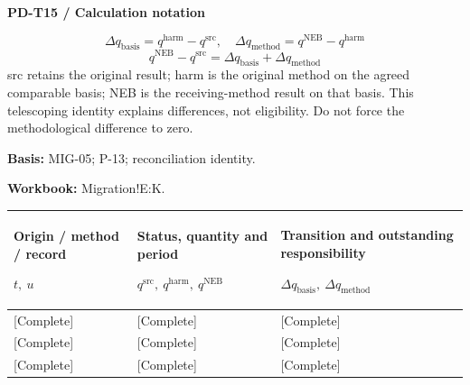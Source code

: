 \par\begingroup\sffamily\fontsize{8}{10}\selectfont\color{NEBGreen}\setlength{\parskip}{2pt}\setlength{\abovedisplayskip}{4pt}\setlength{\belowdisplayskip}{4pt}\setlength{\abovedisplayshortskip}{2pt}\setlength{\belowdisplayshortskip}{3pt}
\textbf{PD-T15 / Calculation notation}\par
{\fontsize{9}{11}\selectfont\[ \Delta q_{\mathrm{basis}}=q^{\mathrm{harm}}-q^{\mathrm{src}},\quad \Delta q_{\mathrm{method}}=q^{\mathrm{NEB}}-q^{\mathrm{harm}} \]}
{\fontsize{9}{11}\selectfont\[ q^{\mathrm{NEB}}-q^{\mathrm{src}}=\Delta q_{\mathrm{basis}}+\Delta q_{\mathrm{method}} \]}
src retains the original result; harm is the original method on the agreed comparable basis; NEB is the receiving-method result on that basis. This telescoping identity explains differences, not eligibility. Do not force the methodological difference to zero.\par
\textbf{Basis:} MIG-05; P-13; reconciliation identity.\par
\textbf{Workbook:} Migration!E:K.\par\endgroup
{\sffamily\fontsize{8.3}{10.3}\selectfont\begin{longtable}{@{}P{52.79mm} P{51.14mm} P{61.14mm}@{}}
\toprule
\textbf{Origin / method / record}\par {\normalfont\fontsize{8.2}{10}\selectfont $t,\ u$} & \textbf{Status, quantity and period}\par {\normalfont\fontsize{8.2}{10}\selectfont $q^{\mathrm{src}},\ q^{\mathrm{harm}},\ q^{\mathrm{NEB}}$} & \textbf{Transition and outstanding responsibility}\par {\normalfont\fontsize{8.2}{10}\selectfont $\Delta q_{\mathrm{basis}},\ \Delta q_{\mathrm{method}}$}\\\midrule\endhead
\rule{0pt}{7.7mm}[Complete] & [Complete] & [Complete]\\\hline
\rule{0pt}{7.7mm}[Complete] & [Complete] & [Complete]\\\hline
\rule{0pt}{7.7mm}[Complete] & [Complete] & [Complete]\\\hline
\end{longtable}}
